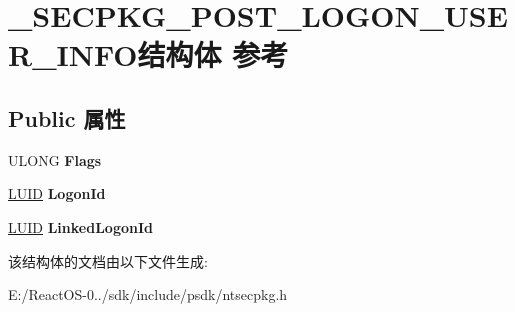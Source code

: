 \hypertarget{struct___s_e_c_p_k_g___p_o_s_t___l_o_g_o_n___u_s_e_r___i_n_f_o}{}\section{\+\_\+\+S\+E\+C\+P\+K\+G\+\_\+\+P\+O\+S\+T\+\_\+\+L\+O\+G\+O\+N\+\_\+\+U\+S\+E\+R\+\_\+\+I\+N\+F\+O结构体 参考}
\label{struct___s_e_c_p_k_g___p_o_s_t___l_o_g_o_n___u_s_e_r___i_n_f_o}
\subsection*{Public 属性}
\begin{DoxyCompactItemize}
\item 
\mbox{\label{struct___s_e_c_p_k_g___p_o_s_t___l_o_g_o_n___u_s_e_r___i_n_f_o_aaf5499b0178a14e7776c96ee1888707a}} 
U\+L\+O\+NG {\bfseries Flags}
\item 
\mbox{\label{struct___s_e_c_p_k_g___p_o_s_t___l_o_g_o_n___u_s_e_r___i_n_f_o_a8e0a31dac5b4ab85200564c7393e8003}} 
\hyperlink{struct___l_u_i_d}{L\+U\+ID} {\bfseries Logon\+Id}
\item 
\mbox{\label{struct___s_e_c_p_k_g___p_o_s_t___l_o_g_o_n___u_s_e_r___i_n_f_o_aa16a2b3ed51cc9c413faf20ef36eeefc}} 
\hyperlink{struct___l_u_i_d}{L\+U\+ID} {\bfseries Linked\+Logon\+Id}
\end{DoxyCompactItemize}


该结构体的文档由以下文件生成\+:\begin{DoxyCompactItemize}
\item 
E\+:/\+React\+O\+S-\/0../sdk/include/psdk/ntsecpkg.\+h\end{DoxyCompactItemize}
